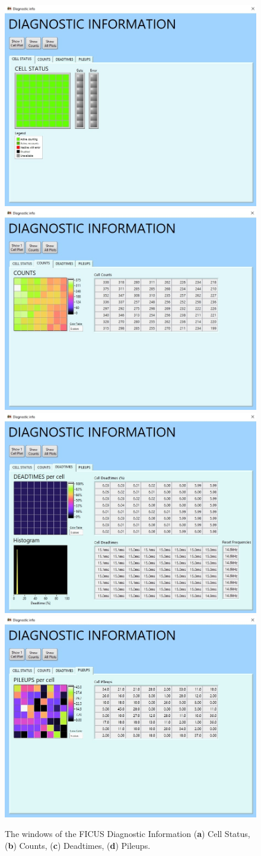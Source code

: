 \documentclass[a4paper,12pt,oneside,pdflatex,italian,final,twocolumn]{article}
\begin{document}
\begin{figure}[h]
\centering
\subfloat
{\includegraphics[width=.48\textwidth]{Capture37.jpg}} \quad
\subfloat
{\includegraphics[width=.48\textwidth]{Capture38.jpg}} \\
\subfloat
{\includegraphics[width=.48\textwidth]{Capture39.jpg}} \quad
\subfloat
{\includegraphics[width=.48\textwidth]{Capture40.jpg}} \\
\caption{The windows of the FICUS Diagnostic Information (\textbf{a}) Cell Status, (\textbf{b}) Counts, (\textbf{c}) Deadtimes, (\textbf{d}) Pileups.}\label{fig:fig27}
\end{figure}
\end{document}
